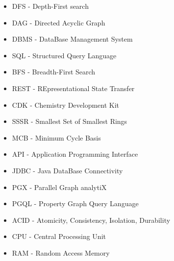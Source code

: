 \documentclass[12pt,a4paper]{report}
\begin{document}



\tableofcontents











\listoffigures

\listoftables


\begin{itemize}
	\item DFS - Depth-First search
	\item DAG - Directed Acyclic Graph
	\item DBMS - DataBase Management System
	\item SQL - Structured Query Language
	\item BFS - Breadth-First Search
	\item REST - REpresentational State Transfer
	\item CDK - Chemistry Development Kit
	\item SSSR - Smallest Set of Smallest Rings
	\item MCB - Minimum Cycle Basis
	\item API - Application Programming Interface
	\item JDBC - Java DataBase Connectivity
	\item PGX - Parallel Graph analytiX
	\item PGQL - Property Graph Query Language
	\item ACID - Atomicity, Consistency, Isolation, Durability
	\item CPU - Central Processing Unit
	\item RAM - Random Access Memory
\end{itemize}
\end{document}
